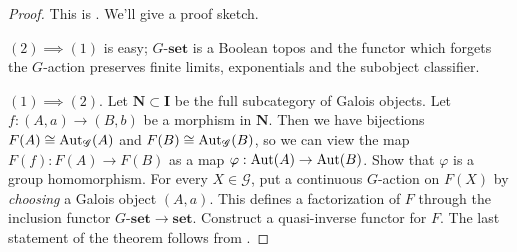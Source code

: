 \begin{proof}
This is \cite[Theorem 8.47]{johnstone77}. We'll give a proof sketch.

$(2) \implies (1)$ is easy; $G\text{-}\mathbf{set}$ is a Boolean topos and the functor which forgets the $G$-action preserves finite limits, exponentials and the subobject classifier.

$(1) \implies (2)$. Let $\mathbf{N} \subset \mathbf{I}$ be the full subcategory of Galois objects. 
Let $f : (A,a) \to (B,b)$ be a morphism in $\mathbf{N}$. Then we have bijections $F(A) \cong \operatorname{Aut}_{\mathscr{G}}(A)$ and $F(B) \cong \operatorname{Aut}_{\mathscr{G}}(B)$, so we can view the map $F(f) : F(A) \to F(B)$ as a map $\varphi : \operatorname{Aut}(A) \to \operatorname{Aut}(B)$. 
Show that $\varphi$ is a group homomorphism. For every $X \in \mathscr{G}$, put a continuous $G$-action on $F(X)$ by \emph{choosing} a Galois object $(A,a)$. This defines a factorization of $F$ through the inclusion functor $G\text{-}\mathbf{set} \to \mathbf{set}$. Construct a quasi-inverse functor for $F$. The last statement of the theorem follows from \cite[Exercise 3.11]{lenstra08}. \qedhere



\end{proof}
